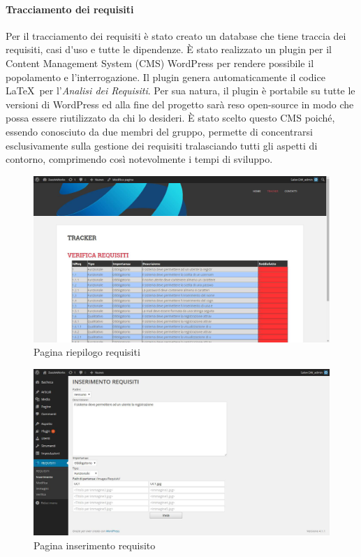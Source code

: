 \paragraph{Tracciamento dei requisiti}
Per il tracciamento dei requisiti è stato creato un \gls{database} che tiene traccia dei requisiti, \gls{casi d'uso} e tutte le dipendenze.
È stato realizzato un \gls{plugin} per il Content Management System (\gls{CMS}) \gls{WordPress} per rendere possibile il popolamento e l'interrogazione.
Il \gls{plugin} genera automaticamente il codice \LaTeX\ per l'\textit{Analisi dei Requisiti}.
Per sua natura, il \gls{plugin} è portabile su tutte le versioni di \gls{WordPress} ed alla fine del progetto sarà reso open-source in modo che possa essere riutilizzato da chi lo desideri. È stato scelto questo \gls{CMS} poiché, essendo conosciuto da due membri del gruppo, permette di concentrarsi esclusivamente sulla gestione dei requisiti tralasciando tutti gli aspetti di contorno, comprimendo così notevolmente i tempi di sviluppo.
\begin{figure}[h]
	\centering
	\includegraphics[width=0.7\linewidth]{img/tracker1}
	\caption[Pagina riepilogo requisiti]{Pagina riepilogo requisiti}
	\label{fig:tracker1}
	\end{figure}
	\begin{figure}[h]
		\centering
		\includegraphics[width=0.7\linewidth]{img/tracker2}
		\caption[Pagina inserimento requisito]{Pagina inserimento requisito}
		\label{fig:tracker2}
		\end{figure}

